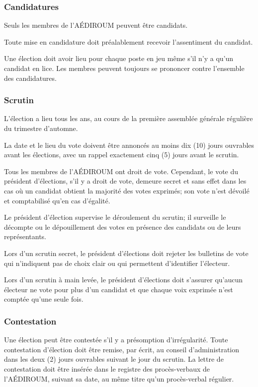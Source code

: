 \documentclass{aediroum}
\begin{document}
\subsubsection{Candidatures}\label{sec:candidatures}
Seuls les membres de l'AÉDIROUM peuvent être candidats.

Toute mise en candidature doit préalablement recevoir l'assentiment du candidat.

Une élection doit avoir lieu pour chaque poste en jeu même s'il n'y a qu'un candidat en lice. Les membres peuvent toujours se prononcer contre l'ensemble des candidatures.

\subsubsection{Scrutin}\label{sec:scrutin-elections}

L'élection a lieu tous les ans, au cours de la première assemblée générale régulière du trimestre d'automne.

La date et le lieu du vote doivent être annoncés au moins dix (10) jours ouvrables avant les élections, avec un rappel exactement cinq (5) jours avant le scrutin.

Tous les membres de l'AÉDIROUM ont droit de vote. Cependant, le vote du président d'élections, s'il y a droit de vote, demeure secret et sans effet dans les cas où un candidat obtient la majorité des votes exprimés; son vote n'est dévoilé et comptabilisé qu'en cas d'égalité.

Le président d'élection supervise le déroulement du scrutin; il surveille le décompte ou le dépouillement des votes en présence des candidats ou de leurs représentants.

Lors d'un scrutin secret, le président d'élections doit rejeter les bulletins de vote qui n'indiquent pas de choix clair ou qui permettent d'identifier l'électeur.

Lors d'un scrutin à main levée, le président d'élections doit s'assurer qu'aucun électeur ne vote pour plus d'un candidat et que chaque voix exprimée n'est comptée qu'une seule fois.

\subsubsection{Contestation}\label{sec:contestation}

Une élection peut être contestée s'il y a présomption d'irrégularité. Toute contestation d'élection doit être remise, par écrit, au conseil d'administration dans les deux (2) jours ouvrables suivant le jour du scrutin. La lettre de contestation doit être insérée dans le registre des procès-verbaux de l'AÉDIROUM, suivant sa date, au même titre qu'un procès-verbal régulier.
\end{document}
